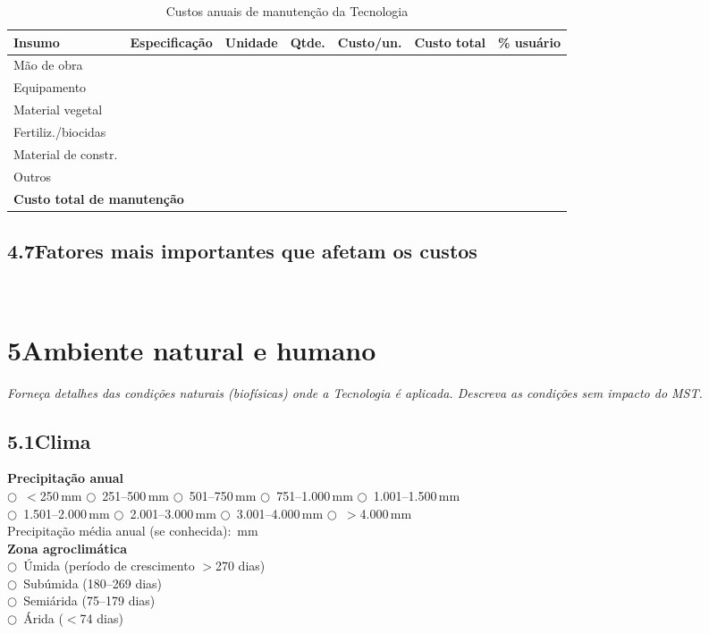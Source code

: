 \begin{table}[htbp]
\centering\small
\caption{Custos anuais de manutenção da Tecnologia}
\label{tab:app_cost_maint}
\begin{tabular}{p{2.8cm}p{2.5cm}lrrrl}
\toprule
\textbf{Insumo} & \textbf{Especificação} & \textbf{Unidade} & \textbf{Qtde.} & \textbf{Custo/un.} & \textbf{Custo total} & \textbf{\% usuário} \\
\midrule
Mão de obra      & & & & & & \\
Equipamento      & & & & & & \\
Material vegetal & & & & & & \\
Fertiliz./biocidas & & & & & & \\
Material de constr. & & & & & & \\
Outros           & & & & & & \\
\midrule
\multicolumn{5}{l}{\textbf{Custo total de manutenção}} & & \\
\bottomrule
\end{tabular}
\end{table}

\subsection{4.7\quad Fatores mais importantes que afetam os custos}
\dotfill\\[2pt]\dotfill

\section{5\quad Ambiente natural e humano}

\textit{Forneça detalhes das condições naturais (biofísicas) onde a Tecnologia é aplicada. Descreva as condições sem impacto do MST.}

\subsection{5.1\quad Clima}

\noindent\textbf{Precipitação anual}\\
$\bigcirc$~$<$250\,mm \quad $\bigcirc$~251--500\,mm \quad $\bigcirc$~501--750\,mm \quad $\bigcirc$~751--1.000\,mm \quad $\bigcirc$~1.001--1.500\,mm\\
$\bigcirc$~1.501--2.000\,mm \quad $\bigcirc$~2.001--3.000\,mm \quad $\bigcirc$~3.001--4.000\,mm \quad $\bigcirc$~$>$4.000\,mm\\[4pt]
Precipitação média anual (se conhecida): \dotfill\,mm\\[4pt]
\textbf{Zona agroclimática}\\
$\bigcirc$~Úmida (período de crescimento $>$270 dias)\\
$\bigcirc$~Subúmida (180--269 dias)\\
$\bigcirc$~Semiárida (75--179 dias)\\
$\bigcirc$~Árida ($<$74 dias)

